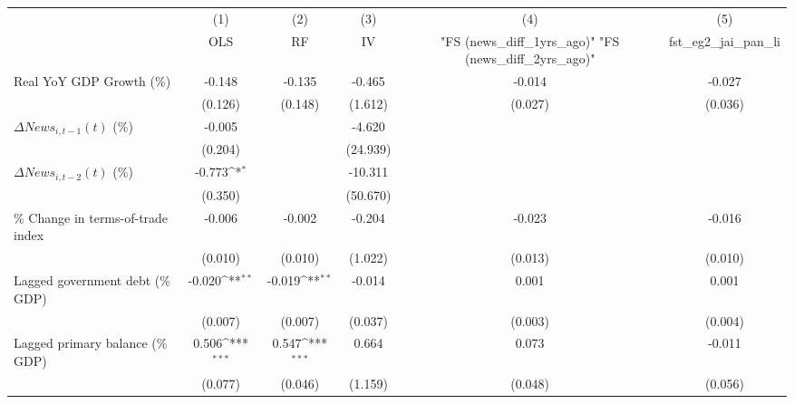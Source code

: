 {
\def\sym#1{\ifmmode^{#1}\else\(^{#1}\)\fi}
\begin{tabular}{l*{5}{c}}
\toprule
                    &\multicolumn{1}{c}{(1)}&\multicolumn{1}{c}{(2)}&\multicolumn{1}{c}{(3)}&\multicolumn{1}{c}{(4)}&\multicolumn{1}{c}{(5)}\\
                    &\multicolumn{1}{c}{OLS}&\multicolumn{1}{c}{RF}&\multicolumn{1}{c}{IV}&\multicolumn{1}{c}{ "FS (news_diff_1yrs_ago)"  "FS (news_diff_2yrs_ago)" }&\multicolumn{1}{c}{fst_eg2_jai_pan_li}\\
\midrule
Real YoY GDP Growth (\%)&      -0.148         &      -0.135         &      -0.465         &      -0.014         &      -0.027         \\
                    &     (0.126)         &     (0.148)         &     (1.612)         &     (0.027)         &     (0.036)         \\
\addlinespace
$ \Delta News_{i,t-1}(t)$ (\%)&      -0.005         &                     &      -4.620         &                     &                     \\
                    &     (0.204)         &                     &    (24.939)         &                     &                     \\
\addlinespace
$ \Delta News_{i,t-2}(t)$ (\%)&      -0.773\sym{*}  &                     &     -10.311         &                     &                     \\
                    &     (0.350)         &                     &    (50.670)         &                     &                     \\
\addlinespace
\% Change in terms-of-trade index&      -0.006         &      -0.002         &      -0.204         &      -0.023         &      -0.016         \\
                    &     (0.010)         &     (0.010)         &     (1.022)         &     (0.013)         &     (0.010)         \\
\addlinespace
Lagged government debt (\% GDP)&      -0.020\sym{**} &      -0.019\sym{**} &      -0.014         &       0.001         &       0.001         \\
                    &     (0.007)         &     (0.007)         &     (0.037)         &     (0.003)         &     (0.004)         \\
\addlinespace
Lagged primary balance (\% GDP)&       0.506\sym{***}&       0.547\sym{***}&       0.664         &       0.073         &      -0.011         \\
                    &     (0.077)         &     (0.046)         &     (1.159)         &     (0.048)         &     (0.056)         \\

\end{tabular}}
